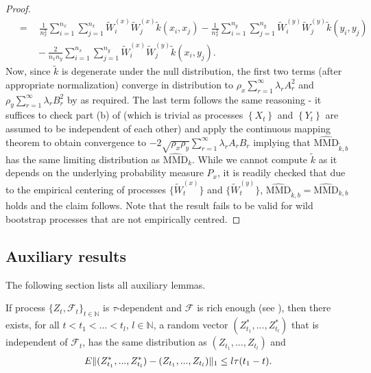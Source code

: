 \begin{proof}
\begin{align*}
{}&=\quad\frac{1}{n_x^2}\sum_{i=1}^{n_x}\sum_{j=1}^{n_x}\tilde W_i^{(x)}\tilde W_j^{(x)}\tilde k(x_i,x_j)-\frac{1}{n_x^2}\sum_{i=1}^{n_y}\sum_{j=1}^{n_y}\tilde W_i^{(y)}\tilde W_j^{(y)}\tilde k(y_i,y_j)\\
{}&\qquad-\frac{2}{n_x n_y}\sum_{i=1}^{n_x}\sum_{j=1}^{n_y}\tilde W_i^{(x)}\tilde W_j^{(y)}\tilde k(x_i,y_j). 
\end{align*}
Now, since $\tilde k$ is degenerate under the null distribution, the first two terms (after appropriate normalization) converge in distribution to $\rho_x\sum_{r=1}^\infty \lambda_r A_r^2$ and  $\rho_y\sum_{r=1}^\infty \lambda_r B_r^2$ by \cite[Theorem 3.1]{leucht_dependent_2013} as required. 
The last term follows the same reasoning - it suffices to check part (b) of \cite[Theorem 3.1]{leucht_dependent_2013} (which is trivial as processes $\left\{ X_t \right\}$ and $\left\{ Y_t \right\}$ are assumed to be independent of each other) and apply the continuous mapping theorem to obtain convergence to $-2\sqrt{\rho_x\rho_y}\sum_{r=1}^\infty \lambda_r A_rB_r$ implying that $\widehat{\text{MMD}}_{\tilde k, b}$ has the same limiting distribution as $\widehat{\text{MMD}}_{k}$.
While we cannot compute $\tilde k$ as it depends on the underlying probability measure $P_x$, it is readily checked that due to the empirical centering of processes $\{\tilde W_t^{(x)}\}$ and $\{\tilde W_t^{(y)}\}$, $\widehat{\text{MMD}}_{\tilde k, b}=\widehat{\text{MMD}}_{k, b}$ holds and the claim follows. Note that the result fails to be valid for wild bootstrap processes that are not empirically centred.
\end{proof}


\subsection{Auxiliary results }
\label{label:aux}
The following section lists all auxiliary lemmas. 

\begin{proposition}{\cite[p.259, Equation 2.1]{leucht_dependent_2013}}
\label{prop:Coupling}
If process  $\{Z_t,\mathcal{F}_t\}_{t \in \mathbb{N}}$  is $\tau$-dependent and $\mathcal{F}$ is rich enough (see \cite[Lemma 5.3]{dedecker2007weak}), then there exists, for all $t<t_1<...<t_l$, $l \in \mathbb N$, a random vector $(Z_{t_1}^*,...,Z_{t_l}^*)$ that is independent of $\mathcal F_t$, has the same distribution  as $(Z_{t_1},...,Z_{t_l})$ and 
\begin{align*}
E \lVert(Z_{t_1}^*,...,Z_{t_l}^*) - (Z_{t_1},...,Z_{t_l})\rVert_1 \leq l \tau(t_1-t).
\end{align*}
\end{proposition}

